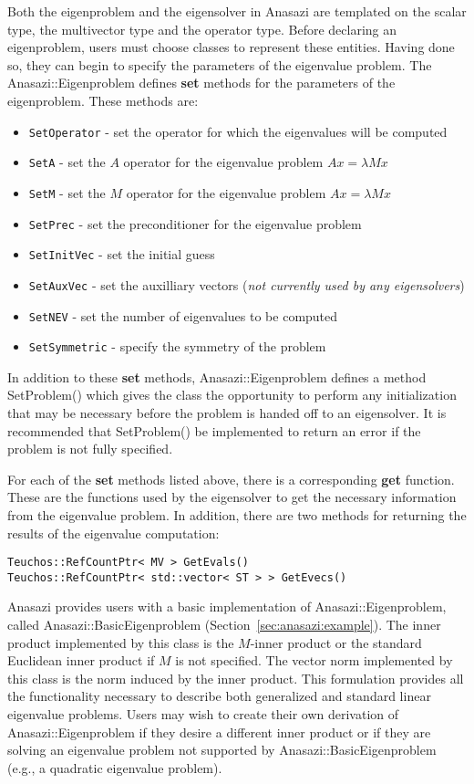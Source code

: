 Both the eigenproblem and the eigensolver in Anasazi are templated 
on the scalar type, the multivector type and the operator type. Before
declaring an eigenproblem, users must choose classes to represent these
entities. Having done so, they can begin to specify the parameters of the
eigenvalue problem. The Anasazi::Eigenproblem defines \textbf{set} methods for
the parameters of the eigenproblem. These methods are:
\begin{itemize}
\item \verb!SetOperator! - set the operator for which the eigenvalues will be computed
\item \verb!SetA! - set the $A$ operator for the eigenvalue problem $A x = \lambda M x$
\item \verb!SetM! - set the $M$ operator for the eigenvalue problem $A x = \lambda M x$
\item \verb!SetPrec! - set the preconditioner for the eigenvalue problem
\item \verb!SetInitVec! - set the initial guess
\item \verb!SetAuxVec! - set the auxilliary vectors (\emph{not currently used by
any eigensolvers})
\item \verb!SetNEV! - set the number of eigenvalues to be computed
\item \verb!SetSymmetric! - specify the symmetry of the problem
\end{itemize}
In addition to these \textbf{set} methods, Anasazi::Eigenproblem defines
a method SetProblem() which gives the class the opportunity to perform
any initialization that may be necessary before the problem is handed off to an
eigensolver. It is recommended that SetProblem() be implemented to
return an error if the problem is not fully specified.

For each of the \textbf{set} methods listed above, there is a corresponding
\textbf{get} function. These are the functions used by the eigensolver to get
the necessary information from the eigenvalue problem. In addition, there are
two methods for returning the results of the eigenvalue computation:
\begin{verbatim}
Teuchos::RefCountPtr< MV > GetEvals()
Teuchos::RefCountPtr< std::vector< ST > > GetEvecs()
\end{verbatim}

Anasazi provides users with a basic implementation of
Anasazi::Eigenproblem, called Anasazi::BasicEigenproblem
(Section~\ref{sec:anasazi:example}). The inner product implemented by this
class is the $M$-inner product or the standard Euclidean inner product if $M$
is not specified. The vector norm implemented by this class is the norm induced
by the inner product. This formulation provides all the functionality
necessary to describe both generalized and standard linear eigenvalue problems.
Users may wish to create their own derivation of Anasazi::Eigenproblem
if they desire a different inner product or if they are solving an eigenvalue
problem not supported by Anasazi::BasicEigenproblem (e.g., a quadratic
eigenvalue problem).

